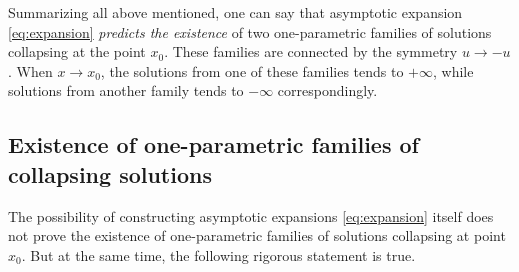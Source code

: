 Summarizing all above mentioned, one can say that asymptotic expansion \eqref{eq:expansion} {\it predicts the existence} of two one-parametric families of solutions collapsing at the point $x_0$.
These families are connected by the symmetry $u \to -u$.
When $x \to x_0$, the solutions from one of these families tends to $+\infty$, while solutions from another family tends to $-\infty$ correspondingly.

\subsection{Existence of one-parametric families of collapsing solutions}

The possibility of constructing asymptotic expansions \eqref{eq:expansion} itself does not prove the existence of one-parametric families of solutions collapsing at point $x_0$.
But at the same time, the following rigorous statement is true.

